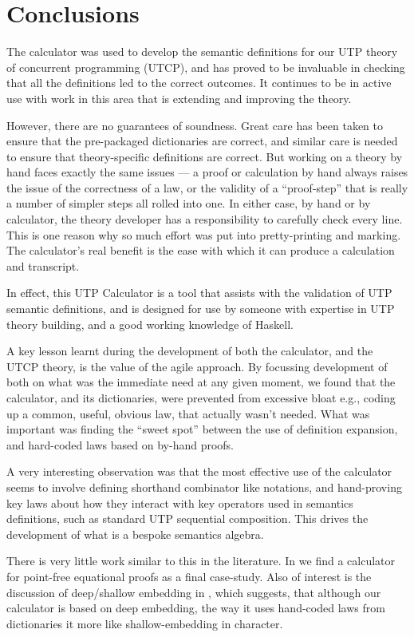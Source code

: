 \section{Conclusions}\label{sec:Conc}
The calculator was used to develop the semantic definitions
for our UTP theory of concurrent programming (UTCP),
and has proved to be invaluable in checking that all
the definitions led to the correct outcomes.
It continues to be in active use with work in this area
that is extending and improving the theory.

However, there are no guarantees of soundness.
Great care has been taken to ensure that the pre-packaged
dictionaries are correct,
and similar care is needed to ensure that theory-specific
definitions are correct.
But working on a theory by hand faces exactly the same issues
--- a proof or calculation by hand always raises the issue
of the correctness of a law, or the validity of a ``proof-step''
that is really a number of simpler steps all rolled into one.
In either case, by hand or by calculator,
the theory developer has a responsibility to carefully check every line.
This is one reason why so much effort was put into pretty-printing
and marking.
The calculator's real benefit is the ease with which
it can produce a calculation and transcript.

In effect, this UTP Calculator is a tool that assists
with the validation of UTP semantic definitions,
and is designed for use by someone with expertise
in UTP theory building,
and a good working knowledge of Haskell.

A key lesson learnt during the development
of both the calculator, and the UTCP theory,
is the value of the agile approach.
By focussing development of both on what
was the immediate need at any given moment,
we found that the calculator, and its dictionaries,
were prevented from excessive bloat
e.g., coding up a common, useful, obvious law,
that actually wasn't needed.
What was important was
finding the ``sweet spot'' between the use of definition
expansion, and hard-coded laws based on by-hand proofs.

A very interesting observation was that the most effective use
of the calculator seems to involve defining shorthand
combinator like notations, and hand-proving key laws
about how they interact with key operators used
in semantics definitions, such as standard UTP sequential composition.
This drives the development of what is a bespoke semantics algebra.


There is very little work similar to this in the literature.
In \cite{Bird14} we find a calculator
for point-free equational proofs as a final case-study.
Also of interest is the discussion of deep/shallow embedding
in \cite{Gibbons:2014:FDS},
which suggests, that although our calculator is based on deep embedding,
the way it uses hand-coded laws from dictionaries
it more like shallow-embedding in character.


